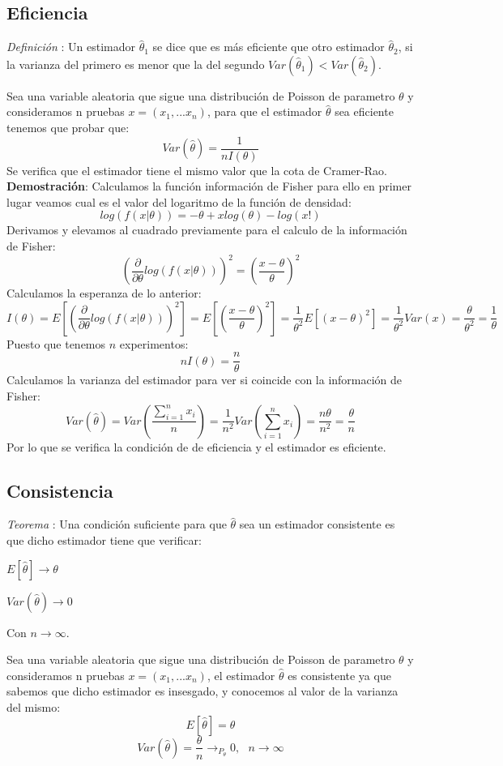 \documentclass[a4paper, 10pt]{article} %
\newcounter{def}
\newcounter{teo}
\begin{document}
\subsection{Eficiencia}
\addtocounter{def}{1}
\emph{Definición }: Un estimador $\hat{\theta}_1$ se dice que es más eficiente que otro estimador $\hat{\theta}_2$, si la varianza del primero es menor que la del segundo $Var(\hat{\theta}_1)<Var(\hat{\theta}_2)$.

Sea una variable aleatoria que sigue una distribución de Poisson de parametro $\theta$ y consideramos n pruebas $x=(x_1,...x_n)$, para que el estimador $\hat{\theta}$ sea eficiente tenemos que probar que:
$$Var(\hat{\theta})=\frac{1}{nI(\theta)}$$
Se verifica que el estimador tiene el mismo valor que la cota de Cramer-Rao.\\
\textbf{Demostración}:
Calculamos la función información de Fisher para ello en primer lugar veamos cual es el valor del logaritmo de la función de densidad: 
$$log(f(x|\theta))=-\theta + xlog(\theta) -log(x!)$$
Derivamos y elevamos al cuadrado previamente para el calculo de la información de Fisher:
$$(\frac{\partial}{\partial\theta}log(f(x|\theta)))^2=(\frac{x-\theta}{\theta})^2$$
Calculamos la esperanza de lo anterior:
$$I(\theta)=E[(\frac{\partial}{\partial\theta}log(f(x|\theta)))^2]=E[(\frac{x-\theta}{\theta})^2]=\frac{1}{\theta^2}E[(x-\theta)^2]=\frac{1}{\theta^2}Var(x)=\frac{\theta}{\theta^2}=\frac{1}{\theta}$$
Puesto que tenemos $n$ experimentos:
$$nI(\theta)=\frac{n}{\theta}$$
Calculamos la varianza del estimador para ver si coincide con la información de Fisher:
$$Var(\hat{\theta})=Var(\frac{\sum_{i=1}^{n}x_i}{n})=\frac{1}{n^2}Var(\sum_{i=1}^{n}x_i)=\frac{n\theta}{n^2}=\frac{\theta}{n}$$
Por lo que se verifica la condición de de eficiencia y el estimador es eficiente.
\subsection{Consistencia}
\addtocounter{teo}{1}
\emph{Teorema }: Una condición suficiente para que $\hat{\theta}$ sea un estimador consistente es que dicho estimador tiene que verificar:
\begin{description}
\item $E[\hat{\theta}] \rightarrow \theta$
\item $Var(\hat{\theta}) \rightarrow 0$
\end{description}
Con $n \rightarrow \infty$.

Sea una variable aleatoria que sigue una distribución de Poisson de parametro $\theta$ y consideramos n pruebas $x=(x_1,...x_n)$, el estimador $\hat{\theta}$ es consistente ya que sabemos que dicho estimador es insesgado, y conocemos al valor de la varianza del mismo:
$$E[\hat{\theta}]=\theta$$
$$Var(\hat{\theta})=\frac{\theta}{n} \rightarrow_{P_\theta} 0, \ \ \ n\rightarrow \infty$$
\end{document}
